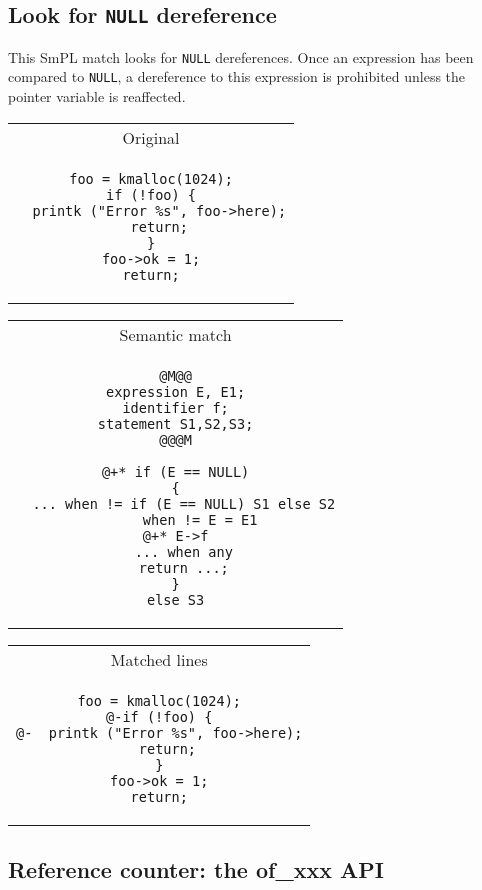 \newpage
\subsection{Look for \texttt{NULL} dereference}

This SmPL match looks for \texttt{NULL} dereferences. Once an
expression has been compared to \texttt{NULL}, a dereference to this
expression is prohibited unless the pointer variable is reaffected.\\

\begin{tabular}{c}
    Original \\

\begin{lstlisting}
foo = kmalloc(1024);
if (!foo) {
  printk ("Error %s", foo->here);
  return;
}
foo->ok = 1;
return;
\end{lstlisting}\\
  \end{tabular}

\vspace{1cm}

\begin{tabular}{c}
  Semantic match\\

\begin{lstlisting}[language=Cocci]
@M@@
expression E, E1;
identifier f;
statement S1,S2,S3;
@@@M

@+* if (E == NULL)
{
  ... when != if (E == NULL) S1 else S2
      when != E = E1
@+* E->f
  ... when any
  return ...;
}
else S3
\end{lstlisting}\\
\end{tabular}

\vspace{1cm}

\begin{tabular}{c}
  Matched lines\\

\begin{lstlisting}[language=PatchC]
foo = kmalloc(1024);
@-if (!foo) {
@-  printk ("Error %s", foo->here);
  return;
}
foo->ok = 1;
return;
\end{lstlisting}\\
\end{tabular}

\newpage
\subsection{Reference counter: the of\_xxx API}

